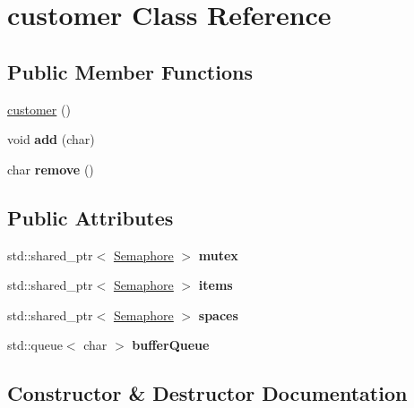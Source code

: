 \hypertarget{classcustomer}{}\section{customer Class Reference}
\label{classcustomer}
\subsection*{Public Member Functions}
\begin{DoxyCompactItemize}
\item 
\mbox{\hyperlink{classcustomer_a83b3fbcc25d2cadc0b203e4bd9cb99a0}{customer}} ()
\item 
\mbox{\label{classcustomer_a18095adc46fb5b983f9ae0561f77ee25}} 
void {\bfseries add} (char)
\item 
\mbox{\label{classcustomer_a0a9d79cb25a5b58355c70e6082e5d7f0}} 
char {\bfseries remove} ()
\end{DoxyCompactItemize}
\subsection*{Public Attributes}
\begin{DoxyCompactItemize}
\item 
\mbox{\label{classcustomer_adf0057deae65394747f209df61e0ee66}} 
std\+::shared\+\_\+ptr$<$ \mbox{\hyperlink{class_semaphore}{Semaphore}} $>$ {\bfseries mutex}
\item 
\mbox{\label{classcustomer_ad52f5d22e54e45ed84bd7ab75c8ca76a}} 
std\+::shared\+\_\+ptr$<$ \mbox{\hyperlink{class_semaphore}{Semaphore}} $>$ {\bfseries items}
\item 
\mbox{\label{classcustomer_a39ae35b38f1df0127968c0ec901d12ee}} 
std\+::shared\+\_\+ptr$<$ \mbox{\hyperlink{class_semaphore}{Semaphore}} $>$ {\bfseries spaces}
\item 
\mbox{\label{classcustomer_a2588f3871867f60dbd09cd46578733df}} 
std\+::queue$<$ char $>$ {\bfseries buffer\+Queue}
\end{DoxyCompactItemize}


\subsection{Constructor \& Destructor Documentation}
\mbox{\label{classcustomer_a83b3fbcc25d2cadc0b203e4bd9cb99a0}} 
